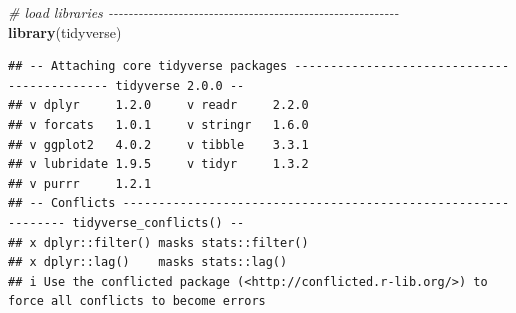 \documentclass[
]{book}
\newenvironment{Shaded}{\begin{snugshade}}{\end{snugshade}}
\newcommand{\CommentTok}[1]{\textcolor[rgb]{0.56,0.35,0.01}{\textit{#1}}}
\newcommand{\FunctionTok}[1]{\textcolor[rgb]{0.13,0.29,0.53}{\textbf{#1}}}
\newcommand{\NormalTok}[1]{#1}
\begin{document}
\begin{Shaded}
\begin{Highlighting}[]
\CommentTok{\# load libraries {-}{-}{-}{-}{-}{-}{-}{-}{-}{-}{-}{-}{-}{-}{-}{-}{-}{-}{-}{-}{-}{-}{-}{-}{-}{-}{-}{-}{-}{-}{-}{-}{-}{-}{-}{-}{-}{-}{-}{-}{-}{-}{-}{-}{-}{-}{-}{-}{-}{-}{-}{-}{-}{-}{-}{-}{-}{-}}
\FunctionTok{library}\NormalTok{(tidyverse)}
\end{Highlighting}
\end{Shaded}

\begin{verbatim}
## -- Attaching core tidyverse packages -------------------------------------------- tidyverse 2.0.0 --
## v dplyr     1.2.0     v readr     2.2.0
## v forcats   1.0.1     v stringr   1.6.0
## v ggplot2   4.0.2     v tibble    3.3.1
## v lubridate 1.9.5     v tidyr     1.3.2
## v purrr     1.2.1     
## -- Conflicts -------------------------------------------------------------- tidyverse_conflicts() --
## x dplyr::filter() masks stats::filter()
## x dplyr::lag()    masks stats::lag()
## i Use the conflicted package (<http://conflicted.r-lib.org/>) to force all conflicts to become errors
\end{verbatim}
\end{document}
